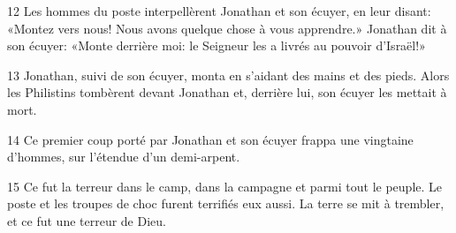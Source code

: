 
12 Les hommes du poste interpellèrent Jonathan et son écuyer, en leur disant: «Montez vers nous! Nous avons quelque chose à vous apprendre.» Jonathan dit à son écuyer: «Monte derrière moi: le Seigneur les a livrés au pouvoir d’Israël!»

13 Jonathan, suivi de son écuyer, monta en s’aidant des mains et des pieds. Alors les Philistins tombèrent devant Jonathan et, derrière lui, son écuyer les mettait à mort.

14 Ce premier coup porté par Jonathan et son écuyer frappa une vingtaine d’hommes, sur l’étendue d’un demi-arpent.

15 Ce fut la terreur dans le camp, dans la campagne et parmi tout le peuple. Le poste et les troupes de choc furent terrifiés eux aussi. La terre se mit à trembler, et ce fut une terreur de Dieu.
